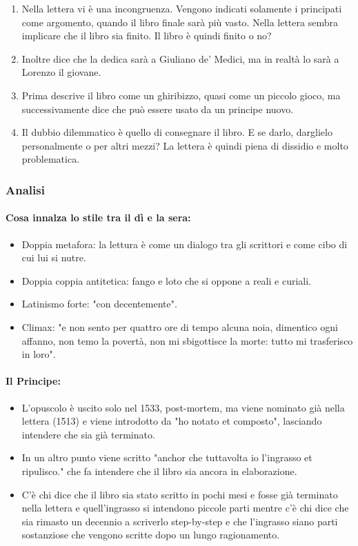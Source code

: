 \documentclass{article}
\begin{document}
\begin{enumerate}
\begin{itemize}
    \end{itemize}
    \item Nella lettera vi è una incongruenza. Vengono indicati solamente i principati come argomento, quando il libro finale sarà più vasto. Nella lettera sembra implicare che il libro sia finito. Il libro è quindi finito o no?
    \item Inoltre dice che la dedica sarà a Giuliano de' Medici, ma in realtà lo sarà a Lorenzo il giovane.
    \item Prima descrive il libro come un ghiribizzo, quasi come un piccolo gioco, ma successivamente dice che può essere usato da un principe nuovo.
    \item Il dubbio dilemmatico è quello di consegnare il libro. E se darlo, darglielo personalmente o per altri mezzi? La lettera è quindi piena di dissidio e molto problematica.
\end{enumerate}

\subsubsection{Analisi}

\paragraph{Cosa innalza lo stile tra il dì e la sera:}
\begin{itemize}
    \item Doppia metafora: la lettura è come un dialogo tra gli scrittori e come cibo di cui lui si nutre.
    \item Doppia coppia antitetica: fango e loto che si oppone a reali e curiali.
    \item Latinismo forte: "con decentemente".
    \item Climax: "e non sento per quattro ore di tempo alcuna noia, dimentico ogni affanno, non temo la povertà, non mi sbigottisce la morte: tutto mi trasferisco in loro".
\end{itemize}

\paragraph{Il Principe:}
\begin{itemize}
    \item L'opuscolo è uscito solo nel 1533, post-mortem, ma viene nominato già nella lettera (1513) e viene introdotto da "ho notato et composto", lasciando intendere che sia già terminato.
    \item In un altro punto viene scritto "anchor che tuttavolta io l'ingrasso et ripulisco." che fa intendere che il libro sia ancora in elaborazione.
    \item C'è chi dice che il libro sia stato scritto in pochi mesi e fosse già terminato nella lettera e quell'ingrasso si intendono piccole parti mentre c'è chi dice che sia rimasto un decennio a scriverlo step-by-step e che l'ingrasso siano parti sostanziose che vengono scritte dopo un lungo ragionamento.
\end{itemize}
\end{document}
